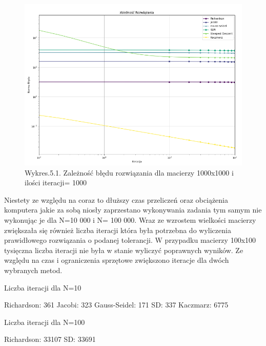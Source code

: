 \documentclass{article}
\begin{document}
\begin{figure}[H]
  \includegraphics[width=1.5\textwidth, center]{Rozco1000.png}
  \centering
  \captionsetup[Tabela]{name=New Table Name}
  \caption*{Wykres.5.1. Zależność błędu rozwiązania dla macierzy 1000x1000 i ilości iteracji= 1000}
\end{figure}

Niestety ze względu na coraz to dłuższy czas przeliczeń oraz obciążenia komputera jakie za sobą niosły zaprzestano wykonywania zadania tym samym nie wykonując je dla N=10 000 i N= 100 000.
Wraz ze wzrostem wielkości macierzy zwiększała się również liczba iteracji która była potrzebna do wyliczenia prawidłowego rozwiązania o podanej tolerancji. W przypadku macierzy 100x100 tysięczna liczba iteracji nie była w stanie wyliczyć poprawnych wyników.
Ze względu na czas i ograniczenia sprzętowe zwiększono iteracje dla dwóch wybranych metod.
\newline
\begin{center}
  Liczba iteracji dla N=10
\end{center}
Richardson: 361\newline
Jacobi: 323\newline
Gauss-Seidel: 171\newline
SD: 337\newline
Kaczmarz: 6775\newline
\newline
\begin{center}
  Liczba iteracji dla N=100
\end{center}
Richardson: 33107\newline
SD: 33691\newline
\end{document}
